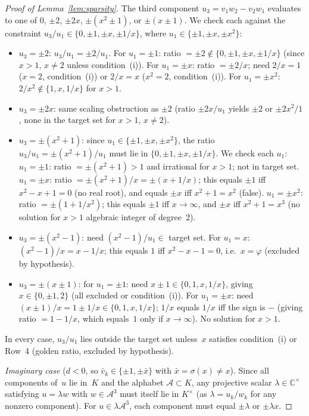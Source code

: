 \documentclass[12pt,a4paper]{article}
\newcommand{\C}{\mathbb{C}}
\begin{document}
\begin{proof}[Proof of Lemma~\ref{lem:sparsity}]
The third component $u_3 = v_1 w_2 - v_2 w_1$ evaluates to one of
$0$, $\pm 2$, $\pm 2x$, $\pm(x^2 \pm 1)$, or $\pm(x \pm 1)$.
We check each against the constraint $u_3/u_1 \in
\{0, \pm 1, \pm x, \pm 1/x\}$, where $u_1 \in \{\pm 1, \pm x,
\pm x^2\}$:
\begin{itemize}
\item $u_3 = \pm 2$: $u_3/u_1 = \pm 2/u_1$.  For $u_1 = \pm 1$:
  ratio $= \pm 2 \notin \{0, \pm 1, \pm x, \pm 1/x\}$ (since
  $x > 1$, $x \neq 2$ unless condition~(i)).  For $u_1 = \pm x$:
  ratio $= \pm 2/x$; need $2/x = 1$ ($x = 2$, condition~(i)) or
  $2/x = x$ ($x^2 = 2$, condition~(i)).  For $u_1 = \pm x^2$:
  $2/x^2 \notin \{1, x, 1/x\}$ for $x > 1$.
\item $u_3 = \pm 2x$: same scaling obstruction as $\pm 2$
  (ratio $\pm 2x/u_1$ yields $\pm 2$ or $\pm 2x^2/1$, none in
  the target set for $x > 1$, $x \neq 2$).
\item $u_3 = \pm(x^2 + 1)$: since $u_1 \in \{\pm 1, \pm x,
  \pm x^2\}$, the ratio $u_3/u_1 = \pm(x^2 + 1)/u_1$ must lie in
  $\{0, \pm 1, \pm x, \pm 1/x\}$.  We check each $u_1$:
  $u_1 = \pm 1$: ratio $= \pm(x^2 + 1) > 1$ and irrational for
  $x > 1$; not in target set.
  $u_1 = \pm x$: ratio $= \pm(x^2 + 1)/x = \pm(x + 1/x)$; this
  equals $\pm 1$ iff $x^2 - x + 1 = 0$ (no real root), and
  equals $\pm x$ iff $x^2 + 1 = x^2$ (false).
  $u_1 = \pm x^2$: ratio $= \pm(1 + 1/x^2)$; this equals $\pm 1$
  iff $x \to \infty$, and $\pm x$ iff $x^2 + 1 = x^3$
  (no solution for $x > 1$ algebraic integer of degree~$2$).
\item $u_3 = \pm(x^2 - 1)$: need $(x^2 - 1)/u_1 \in$ target set.
  For $u_1 = x$: $(x^2 - 1)/x = x - 1/x$; this equals $1$ iff
  $x^2 - x - 1 = 0$, i.e.\ $x = \varphi$ (excluded by hypothesis).
\item $u_3 = \pm(x \pm 1)$: for $u_1 = \pm 1$: need
  $x \pm 1 \in \{0, 1, x, 1/x\}$, giving $x \in \{0, \pm 1, 2\}$
  (all excluded or condition~(i)).  For $u_1 = \pm x$: need
  $(x \pm 1)/x = 1 \pm 1/x \in \{0, 1, x, 1/x\}$; $1/x$ equals
  $1/x$ iff the sign is $-$ (giving ratio $= 1 - 1/x$, which
  equals~$1$ only if $x \to \infty$).  No solution for $x > 1$.
\end{itemize}
In every case, $u_3/u_1$ lies outside the target set unless~$x$
satisfies condition~(i) or Row~4 (golden ratio, excluded by
hypothesis).

\emph{Imaginary case} ($d < 0$, so $\bar{v}_k \in \{\pm 1,
\pm\bar{x}\}$ with $\bar{x} = \sigma(x) \neq x$).
Since all components of~$u$ lie in~$K$ and the alphabet
$\mathcal{A} \subset K$, any projective scalar $\lambda \in \C^\times$
satisfying $u = \lambda w$ with $w \in \mathcal{A}^3$ must itself lie
in $K^\times$ (as $\lambda = u_k / w_k$ for any nonzero component).
For $u \in \lambda\mathcal{A}^3$, each component must equal
$\pm\lambda$ or $\pm\lambda x$.


\end{proof}
\end{document}
